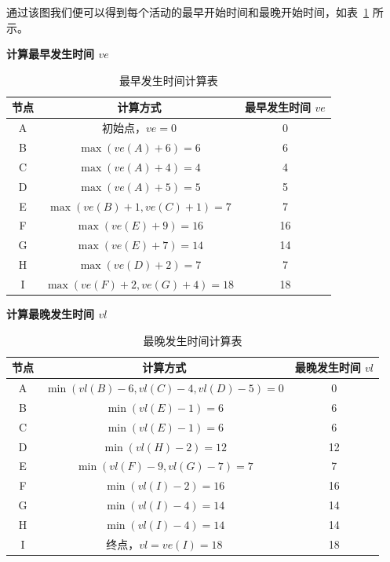 \documentclass[lang=cn,newtx,10pt,scheme=chinese]{../elegantbook}
\begin{document}
通过该图我们便可以得到每个活动的最早开始时间和最晚开始时间，如表~\ref{tab:AOE} 所示。

\textbf{计算最早发生时间 $ve$}
\begin{table}[!htbp]
    \centering
    \begin{tabular}{c|c|c}
        \toprule
        \textbf{节点} & \textbf{计算方式} & \textbf{最早发生时间 $ve$} \\
        \midrule
        A & 初始点，$ve=0$ & 0 \\
        B & $\max(ve(A) + 6) = 6$ & 6 \\
        C & $\max(ve(A) + 4) = 4$ & 4 \\
        D & $\max(ve(A) + 5) = 5$ & 5 \\
        E & $\max(ve(B) + 1, ve(C) + 1) = 7$ & 7 \\
        F & $\max(ve(E) + 9) = 16$ & 16 \\
        G & $\max(ve(E) + 7) = 14$ & 14 \\
        H & $\max(ve(D) + 2) = 7$ & 7 \\
        I & $\max(ve(F) + 2, ve(G) + 4) = 18$ & 18 \\
        \bottomrule
    \end{tabular}
    \caption{最早发生时间计算表}
    \label{tab:AOE}
\end{table}

\textbf{计算最晚发生时间 $vl$}
\begin{table}[!htbp]
    \centering
    \begin{tabular}{c|c|c}
        \toprule
        \textbf{节点} & \textbf{计算方式} & \textbf{最晚发生时间 $vl$} \\
        \midrule
        A & $\min(vl(B) - 6, vl(C) - 4, vl(D) - 5) = 0$ & 0 \\
        B & $\min(vl(E) - 1) = 6$ & 6 \\
        C & $\min(vl(E) - 1) = 6$ & 6 \\
        D & $\min(vl(H) - 2) = 12$ & 12 \\
        E & $\min(vl(F) - 9, vl(G) - 7) = 7$ & 7 \\
        F & $\min(vl(I) - 2) = 16$ & 16 \\
        G & $\min(vl(I) - 4) = 14$ & 14 \\
        H & $\min(vl(I) - 4) = 14$ & 14 \\
        I & 终点，$vl = ve(I) = 18$ & 18 \\
        \bottomrule
    \end{tabular}
    \caption{最晚发生时间计算表}
\end{table}
\end{document}
